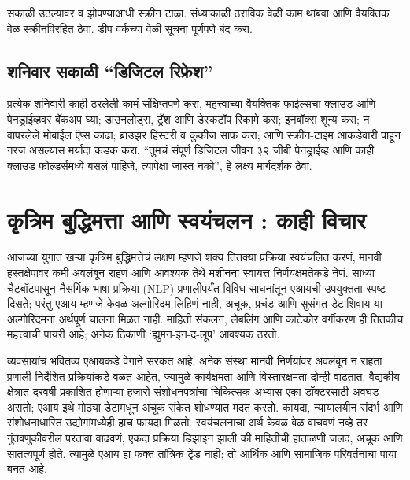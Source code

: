 सकाळी उठल्यावर व झोपण्याआधी स्क्रीन टाळा. संध्याकाळी ठराविक वेळी काम थांबवा आणि वैयक्तिक वेळ स्क्रीनविरहित ठेवा. डीप वर्कच्या वेळी सूचना पूर्णपणे बंद करा.

\section*{शनिवार सकाळी “डिजिटल रिफ्रेश”}

प्रत्येक शनिवारी काही ठरलेली कामं संक्षिप्तपणे करा, महत्त्वाच्या वैयक्तिक फाईल्सचा क्लाउड आणि पेनड्राईव्हवर बॅकअप घ्या; डाउनलोड्स, ट्रॅश आणि डेस्कटॉप रिकामे करा; इनबॉक्स शून्य करा; न वापरलेले मोबाईल ऍप्स काढा; ब्राउझर हिस्टरी व कुकीज साफ करा; आणि स्क्रीन-टाइम आकडेवारी पाहून गरज असल्यास मर्यादा कडक करा. “तुमचं संपूर्ण डिजिटल जीवन ३२ जीबी पेनड्राईव्ह आणि काही क्लाउड फोल्डर्समध्ये बसलं पाहिजे, त्यापेक्षा जास्त नको”, हे लक्ष्य मार्गदर्शक ठेवा.

\chapter{कृत्रिम बुद्धिमत्ता आणि स्वयंचलन : काही विचार}

आजच्या युगात खऱ्या कृत्रिम बुद्धिमत्तेचं लक्षण म्हणजे शक्य तितक्या प्रक्रिया स्वयंचलित करणं, मानवी हस्तक्षेपावर कमी अवलंबून राहणं आणि आवश्यक तेथे मशीनना स्वायत्त निर्णयक्षमतेकडे नेणं. साध्या चैटबॉटपासून नैसर्गिक भाषा प्रक्रिया (NLP) प्रणालीपर्यंत विविध साधनांतून एआयची उपयुक्तता स्पष्ट दिसते; परंतु एआय म्हणजे केवळ अल्गोरिदम लिहिणं नाही, अचूक, प्रचंड आणि सुसंगत डेटाशिवाय या अल्गोरिदमना अर्थपूर्ण चालना मिळत नाही. माहिती संकलन, लेबलिंग आणि काटेकोर वर्गीकरण ही तितकीच महत्त्वाची पायरी आहे; अनेक ठिकाणी ‘ह्युमन-इन-द-लूप’ आवश्यक ठरतो.

व्यवसायांचं भवितव्य एआयकडे वेगाने सरकत आहे. अनेक संस्था मानवी निर्णयांवर अवलंबून न राहता प्रणाली-निर्देशित प्रक्रियांकडे वळत आहेत, ज्यामुळे कार्यक्षमता आणि विस्तारक्षमता दोन्ही वाढतात. वैद्यकीय क्षेत्रात दरवर्षी प्रकाशित होणाऱ्या हजारो संशोधनपत्रांचा चिकित्सक अभ्यास एका डॉक्टरसाठी अवघड असतो; एआय इथे मोठ्या डेटामधून अचूक संकेत शोधण्यात मदत करतो. कायदा, न्यायालयीन संदर्भ आणि संशोधनाधारित उद्योगांमध्येही हाच फायदा मिळतो. स्वयंचलनाचा अर्थ केवळ वेळ वाचवणं नव्हे तर गुंतवणुकीवरील परतावा वाढवणं, एकदा प्रक्रिया डिझाइन झाली की माहितीची हाताळणी जलद, अचूक आणि सातत्यपूर्ण होते. त्यामुळे एआय हा फक्त तांत्रिक ट्रेंड नाही; तो आर्थिक आणि सामाजिक परिवर्तनाचा पाया बनत आहे.

